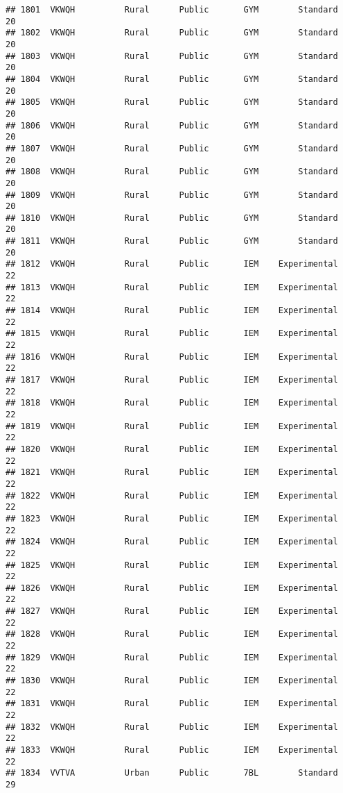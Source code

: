 \documentclass[
]{article}
\begin{document}
\begin{verbatim}
## 1801  VKWQH          Rural      Public       GYM        Standard        20
## 1802  VKWQH          Rural      Public       GYM        Standard        20
## 1803  VKWQH          Rural      Public       GYM        Standard        20
## 1804  VKWQH          Rural      Public       GYM        Standard        20
## 1805  VKWQH          Rural      Public       GYM        Standard        20
## 1806  VKWQH          Rural      Public       GYM        Standard        20
## 1807  VKWQH          Rural      Public       GYM        Standard        20
## 1808  VKWQH          Rural      Public       GYM        Standard        20
## 1809  VKWQH          Rural      Public       GYM        Standard        20
## 1810  VKWQH          Rural      Public       GYM        Standard        20
## 1811  VKWQH          Rural      Public       GYM        Standard        20
## 1812  VKWQH          Rural      Public       IEM    Experimental        22
## 1813  VKWQH          Rural      Public       IEM    Experimental        22
## 1814  VKWQH          Rural      Public       IEM    Experimental        22
## 1815  VKWQH          Rural      Public       IEM    Experimental        22
## 1816  VKWQH          Rural      Public       IEM    Experimental        22
## 1817  VKWQH          Rural      Public       IEM    Experimental        22
## 1818  VKWQH          Rural      Public       IEM    Experimental        22
## 1819  VKWQH          Rural      Public       IEM    Experimental        22
## 1820  VKWQH          Rural      Public       IEM    Experimental        22
## 1821  VKWQH          Rural      Public       IEM    Experimental        22
## 1822  VKWQH          Rural      Public       IEM    Experimental        22
## 1823  VKWQH          Rural      Public       IEM    Experimental        22
## 1824  VKWQH          Rural      Public       IEM    Experimental        22
## 1825  VKWQH          Rural      Public       IEM    Experimental        22
## 1826  VKWQH          Rural      Public       IEM    Experimental        22
## 1827  VKWQH          Rural      Public       IEM    Experimental        22
## 1828  VKWQH          Rural      Public       IEM    Experimental        22
## 1829  VKWQH          Rural      Public       IEM    Experimental        22
## 1830  VKWQH          Rural      Public       IEM    Experimental        22
## 1831  VKWQH          Rural      Public       IEM    Experimental        22
## 1832  VKWQH          Rural      Public       IEM    Experimental        22
## 1833  VKWQH          Rural      Public       IEM    Experimental        22
## 1834  VVTVA          Urban      Public       7BL        Standard        29

\end{verbatim}
\end{document}
